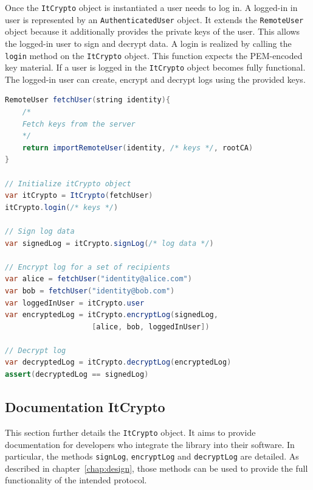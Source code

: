 \documentclass[../main.tex]{subfiles}
\begin{document}
Once the \verb|ItCrypto| object is instantiated a user needs to log in.
A logged-in in user is represented by an \verb|AuthenticatedUser| object.
It extends the \verb|RemoteUser| object because it additionally provides the private keys of the user.
This allows the logged-in user to sign and decrypt data.
A login is realized by calling the \verb|login| method on the \verb|ItCrypto| object.
This function expects the PEM-encoded key material.
If a user is logged in the \verb|ItCrypto| object becomes fully functional.
The logged-in user can create, encrypt and decrypt logs using the provided keys.

\begin{lstlisting}[label=lst:pseudocode,float,floatplacement=tbp, language=Java, caption={Pseudocode of creating, encrypting and decrypting logs using the provided libraries.}, morekeywords={RemoteUser, var, assert}, commentstyle=\color{codegreen}]
RemoteUser fetchUser(string identity){
    /*
    Fetch keys from the server
    */
    return importRemoteUser(identity, /* keys */, rootCA)
}

// Initialize itCrypto object
var itCrypto = ItCrypto(fetchUser)
itCrypto.login(/* keys */)

// Sign log data
var signedLog = itCrypto.signLog(/* log data */)

// Encrypt log for a set of recipients
var alice = fetchUser("identity@alice.com")
var bob = fetchUser("identity@bob.com")
var loggedInUser = itCrypto.user
var encryptedLog = itCrypto.encryptLog(signedLog, 
                    [alice, bob, loggedInUser])

// Decrypt log
var decryptedLog = itCrypto.decryptLog(encryptedLog)
assert(decryptedLog == signedLog)
\end{lstlisting}

\subsection{Documentation ItCrypto}
This section further details the \verb|ItCrypto| object.
It aims to provide documentation for developers who integrate the library into their software.
In particular, the methods \verb|signLog|, \verb|encryptLog| and \verb|decryptLog| are detailed.
As described in chapter~\ref{chap:design}, those methods can be used to provide the full functionality of the intended protocol.
\end{document}
